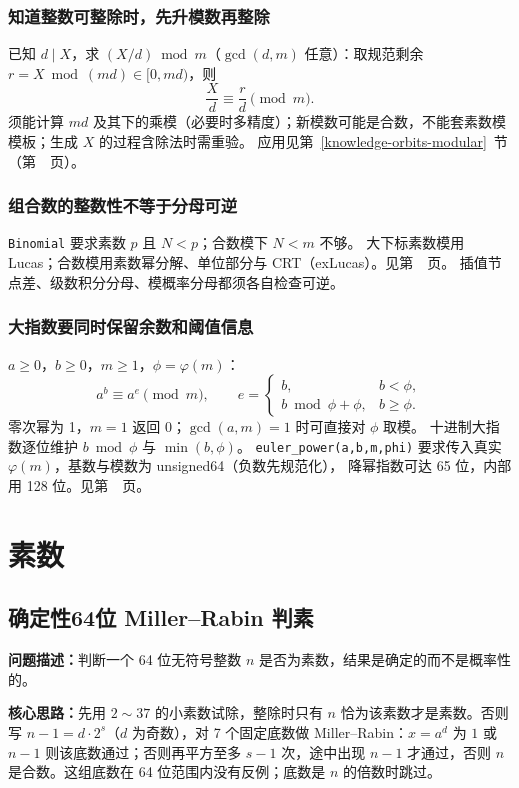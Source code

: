 \subsubsection{知道整数可整除时，先升模数再整除}
已知 $d\mid X$，求 $(X/d)\bmod m$（$\gcd(d,m)$ 任意）：取规范剩余 $r=X\bmod(md)\in[0,md)$，则
\[
\frac Xd\equiv\frac rd\pmod m.
\]
须能计算 $md$ 及其下的乘模（必要时多精度）；新模数可能是合数，不能套素数模模板；生成 $X$ 的过程含除法时需重验。
应用见第~\ref{knowledge-orbits-modular}~节（第~\pageref{knowledge-orbits-modular}~页）。

\subsubsection{组合数的整数性不等于分母可逆}
\texttt{Binomial} 要求素数 $p$ 且 $N<p$；合数模下 $N<m$ 不够。
大下标素数模用 Lucas；合数模用素数幂分解、单位部分与 CRT（exLucas）。见第~\pageref{compact-Binomial}~页。
插值节点差、级数积分分母、模概率分母都须各自检查可逆。

\subsubsection{大指数要同时保留余数和阈值信息}
$a\ge0$，$b\ge0$，$m\ge1$，$\phi=\varphi(m)$：
\[
a^b\equiv a^{e}\pmod m,\qquad
e=\begin{cases}
b,&b<\phi,\\
b\bmod\phi+\phi,&b\ge\phi.
\end{cases}
\]
零次幂为 1，$m=1$ 返回 0；$\gcd(a,m)=1$ 时可直接对 $\phi$ 取模。
十进制大指数逐位维护 $b\bmod\phi$ 与 $\min(b,\phi)$。
\texttt{euler\_power(a,b,m,phi)} 要求传入真实 $\varphi(m)$，基数与模数为 unsigned64（负数先规范化），
降幂指数可达 65 位，内部用 128 位。见第~\pageref{compact-euler_power}~页。


\Needspace{583pt}

\section{素数}

\subsection{确定性64位 Miller--Rabin 判素}\label{compact-Prime64}

\noindent\textbf{问题描述：}\allowbreak 判断一个 64 位无符号整数 $n$ 是否为素数，结果是确定的而不是概率性的。

\textbf{核心思路：}\allowbreak 先用 $2\sim37$ 的小素数试除，整除时只有 $n$ 恰为该素数才是素数。否则写 $n-1=d\cdot2^s$（$d$ 为奇数），对 7 个固定底数做 Miller--Rabin：$x=a^d$ 为 $1$ 或 $n-1$ 则该底数通过；否则再平方至多 $s-1$ 次，途中出现 $n-1$ 才通过，否则 $n$ 是合数。这组底数在 64 位范围内没有反例；底数是 $n$ 的倍数时跳过。


